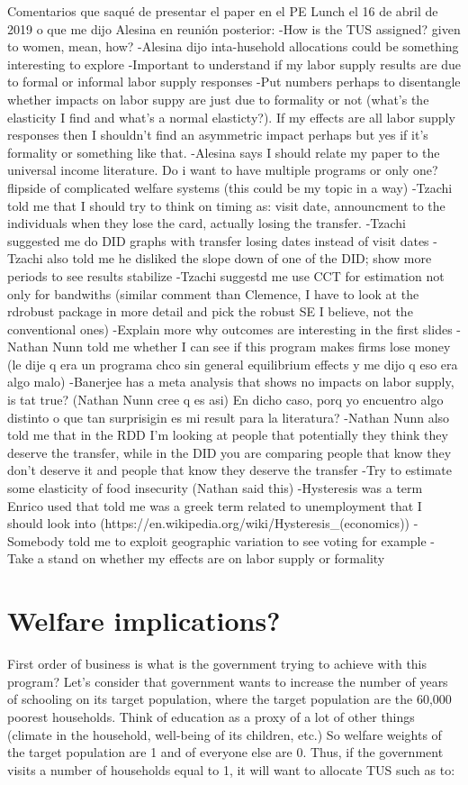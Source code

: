\documentclass[12pt]{article}
\begin{document}
Comentarios que saqué de presentar el paper en el PE Lunch el 16 de abril de 2019 o que me dijo Alesina en reunión posterior:
-How is the TUS assigned? given to women, mean, how?
-Alesina dijo inta-husehold allocations could be something interesting to explore
-Important to understand if my labor supply results are due to formal or informal labor supply responses
-Put numbers perhaps to disentangle whether impacts on labor suppy are just due to formality or not (what's the elasticity I find and what's a  normal elasticty?). If my effects are all labor supply responses then I shouldn't find an asymmetric impact perhaps but yes if it's formality or something like that.
-Alesina says I should relate my paper to the universal income literature. Do i want to have multiple programs or only one? flipside of complicated welfare systems (this could be my topic in a way)
-Tzachi told me that I should try to think on timing as: visit date, announcment to the individuals when they lose the card, actually losing the transfer.
-Tzachi suggested me do DID graphs with transfer losing dates instead of visit dates
-Tzachi also told me he disliked the slope down of one of the DID; show more periods to see results stabilize
-Tzachi suggestd me use CCT for estimation not only for bandwiths (similar comment than Clemence, I have to look at the rdrobust package in more detail and pick the robust SE I believe, not the conventional ones)
-Explain more why outcomes are interesting in the first slides
-Nathan Nunn told me whether I can see if this program makes firms lose money (le dije q era un programa chco sin general equilibrium effects y me dijo q eso era algo malo)
-Banerjee has a meta analysis that shows no impacts on labor supply, is tat true? (Nathan Nunn cree q es asi) En dicho caso, porq yo encuentro algo distinto o que tan surprisigin es mi result para la literatura?
-Nathan Nunn also told me that in the RDD I'm looking at people that potentially they think they deserve the transfer, while in the DID you are comparing people that know they don't deserve it and people that know they deserve the transfer
-Try to estimate some elasticity of food insecurity (Nathan said this)
-Hysteresis was a term Enrico used that told me was a greek term related to unemployment that I should look into (https://en.wikipedia.org/wiki/Hysteresis_(economics))
-Somebody told me to exploit geographic variation to see voting for example
-Take a stand on whether my effects are on labor supply or formality



\section{Welfare implications?}
First order of business is what is the government trying to achieve with this program? Let's consider that government wants to increase the number of years of schooling on its target population, where the target population are the 60,000 poorest households. Think of education as a proxy of a lot of other things (climate in the household, well-being of its children, etc.) So welfare weights of the target population are 1 and of everyone else are 0. Thus, if the government visits a number of households equal to 1, it will want to allocate TUS such as to:
\end{document}
